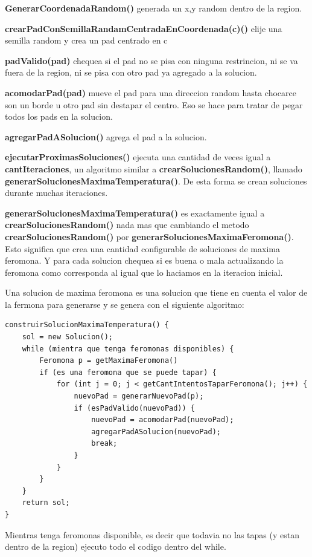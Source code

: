 \textbf{GenerarCoordenadaRandom()} generada un x,y random dentro de la region. 

\textbf{crearPadConSemillaRandamCentradaEnCoordenada(c)()} elije una semilla random y crea un pad centrado en c

\textbf{padValido(pad)} chequea si el pad no se pisa con ninguna restrincion, ni se va fuera de la region, ni se pisa con otro pad ya agregado a la solucion.

\textbf{acomodarPad(pad)} mueve el pad para una direccion random hasta chocarce son un borde u otro pad sin destapar el centro. Eso se hace para tratar de pegar todos los pads en la solucion.

\textbf{agregarPadASolucion()} agrega el pad a la solucion.

\textbf{ejecutarProximasSoluciones()} ejecuta una cantidad de veces igual a \textbf{cantIteraciones}, un algoritmo similar a \textbf{crearSolucionesRandom()}, llamado \textbf{generarSolucionesMaximaTemperatura()}. De esta forma se crean soluciones durante muchas iteraciones.

\textbf{generarSolucionesMaximaTemperatura()} es exactamente igual a \textbf{crearSolucionesRandom()} nada mas que cambiando el metodo \textbf{crearSolucionesRandom()} por \textbf{generarSolucionesMaximaFeromona()}. Esto significa que crea una cantidad configurable de soluciones de maxima feromona. Y para cada solucion chequea si es buena o mala actualizando la feromona como corresponda al igual que lo haciamos en la iteracion inicial.

Una solucion de maxima feromona es una solucion que tiene en cuenta el valor de la fermona para generarse y se genera con el siguiente algoritmo:


\begin{verbatim}
construirSolucionMaximaTemperatura() {
    sol = new Solucion();
    while (mientra que tenga feromonas disponibles) {
        Feromona p = getMaximaFeromona()
        if (es una feromona que se puede tapar) {
            for (int j = 0; j < getCantIntentosTaparFeromona(); j++) {
                nuevoPad = generarNuevoPad(p);
                if (esPadValido(nuevoPad)) {
                    nuevoPad = acomodarPad(nuevoPad);
                    agregarPadASolucion(nuevoPad);
                    break;
                }
            }
        }
    }
    return sol;
}
\end{verbatim}

Mientras tenga feromonas disponible, es decir que todavia no las tapas (y estan dentro de la region) ejecuto todo el codigo dentro del while. 

